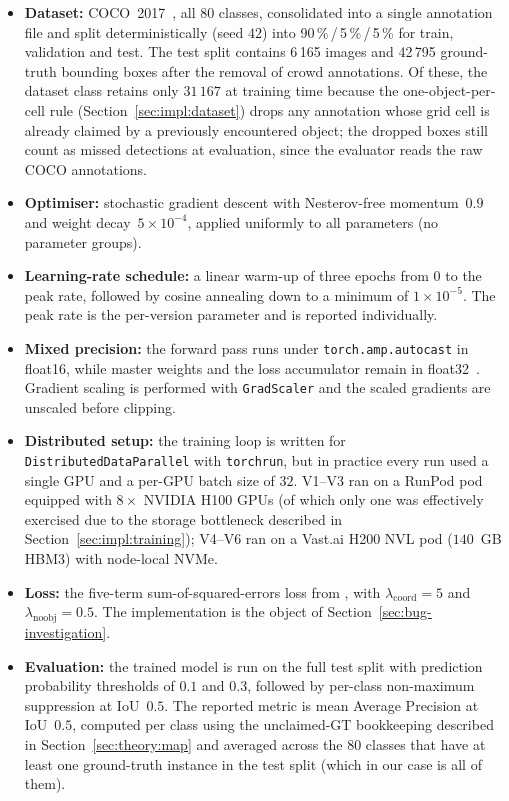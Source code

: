 \begin{itemize}
    \item \textbf{Dataset:} COCO~2017~\citep{lin2014microsoft}, all 80 classes,
        consolidated into a single annotation file and split deterministically
        (seed $42$) into 90\,\%\,/\,5\,\%\,/\,5\,\% for train, validation and
        test. The test split contains 6\,165 images and 42\,795 ground-truth
        bounding boxes after the removal of crowd annotations. Of these, the
        dataset class retains only $31\,167$ at training time because the
        one-object-per-cell rule (Section~\ref{sec:impl:dataset}) drops any
        annotation whose grid cell is already claimed by a previously
        encountered object; the dropped boxes still count as missed
        detections at evaluation, since the evaluator reads the raw COCO
        annotations.
    \item \textbf{Optimiser:} stochastic gradient descent with Nesterov-free
        momentum~$0.9$ and weight decay~$5\!\times\!10^{-4}$, applied uniformly
        to all parameters (no parameter groups).
    \item \textbf{Learning-rate schedule:} a linear warm-up of three epochs
        from $0$ to the peak rate, followed by cosine annealing
        \citep{loshchilov2017sgdr} down to a minimum of
        $1\!\times\!10^{-5}$. The peak rate is the per-version
        parameter and is reported individually.
    \item \textbf{Mixed precision:} the forward pass runs under
        \texttt{torch.amp.autocast} in float16, while master weights and the
        loss accumulator remain in float32~\citep{micikevicius2018mixed}.
        Gradient scaling is performed with \texttt{GradScaler} and the scaled
        gradients are unscaled before clipping.
    \item \textbf{Distributed setup:} the training loop is written for
        \texttt{DistributedDataParallel} with \texttt{torchrun}, but in
        practice every run used a single GPU and a per-GPU batch size of
        $32$. V1--V3 ran on a RunPod pod equipped with $8\!\times$ NVIDIA H100
        GPUs (of which only one was effectively exercised due to the storage
        bottleneck described in Section~\ref{sec:impl:training});
        V4--V6 ran on a Vast.ai H200 NVL pod ($140$~GB HBM3) with
        node-local NVMe.
    \item \textbf{Loss:} the five-term sum-of-squared-errors loss from
        \citet{redmon2016you}, with $\lambda_{\text{coord}}=5$ and
        $\lambda_{\text{noobj}}=0.5$. The implementation is the object of
        Section~\ref{sec:bug-investigation}.
    \item \textbf{Evaluation:} the trained model is run on the full test split
        with prediction probability thresholds of $0.1$ and $0.3$, followed by
        per-class non-maximum suppression at IoU~$0.5$. The reported metric is
        mean Average Precision at IoU~$0.5$, computed per class using the
        unclaimed-GT bookkeeping described in
        Section~\ref{sec:theory:map} and averaged across the 80 classes that have at
        least one ground-truth instance in the test split (which in our case is
        all of them).
\end{itemize}

